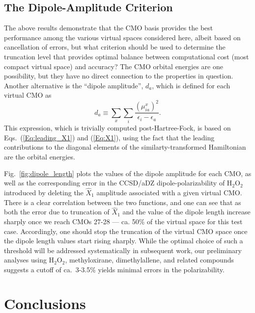 \documentclass[11pt,article]{achemso}
\begin{document}
\subsection{The Dipole-Amplitude Criterion}

The above results demonstrate that the CMO basis provides the best performance
among the various virtual spaces considered here, albeit based on cancellation
of errors, but what criterion should be used to determine the truncation level
that provides optimal balance between computational cost (most compact virtual
space) and accuracy?  The CMO orbital energies are one possibility, but they
have no direct connection to the properties in question.  Another alternative
is the ``dipole amplitude'', $d_a$, which is defined for each virtual CMO as
\begin{equation}
d_a \equiv \sum\limits_x\sum\limits_i\frac{({\mu^x_{ia}})^2}{\epsilon_i - \epsilon_a}.
\label{Eq:dipole}
\end{equation}
This expression, which is trivially computed post-Hartree-Fock, is based on
Eqs.~(\ref{Eq:leading_X1}) and (\ref{Eq:X1}), using the fact that the leading
contributions to the diagonal elements of the similarty-transformed
Hamiltonian are the orbital energies.  

Fig.~\ref{fig:dipole_length} plots the values of the dipole amplitude for
each CMO, as well as the corresponding error in the CCSD/aDZ
dipole-polarizability of H$_2$O$_2$ introduced by deleting the $\hat{X}_1$
amplitude associated with a given virtual CMO. There is a clear correlation
between the two functions, and one can see that as both the error due to
truncation of $\hat{X}_1$ and the value of the dipole length increase sharply
once we reach CMOs 27-28 --- ca. 50\% of the virtual space for this test case.
Accordingly, one should stop the truncation of the virtual CMO space once the
dipole length values start rising sharply.  While the optimal choice of
such a threshold will be addressed systematically in subsequent work, our
preliminary analyses using H$_2$O$_2$, methyloxirane, dimethylallene, and
related compounds suggests a cutoff of ca.\ 3-3.5\% yields minimal errors
in the polarizability.

\section{Conclusions}
\end{document}
